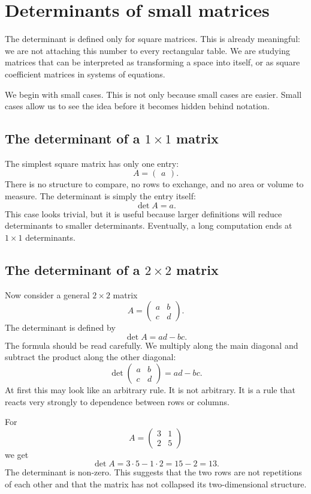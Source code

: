 \section{Determinants of small matrices}

The determinant is defined only for square matrices. This is already meaningful: we are not attaching this number to every rectangular table. We are studying matrices that can be interpreted as transforming a space into itself, or as square coefficient matrices in systems of equations.

We begin with small cases. This is not only because small cases are easier. Small cases allow us to see the idea before it becomes hidden behind notation.

\subsection{The determinant of a \(1\times1\) matrix}

The simplest square matrix has only one entry:
\[
A=\begin{pmatrix}a\end{pmatrix}.
\]
There is no structure to compare, no rows to exchange, and no area or volume to measure. The determinant is simply the entry itself:
\[
\det A=a.
\]
This case looks trivial, but it is useful because larger definitions will reduce determinants to smaller determinants. Eventually, a long computation ends at \(1\times1\) determinants.

\subsection{The determinant of a \(2\times2\) matrix}

Now consider a general \(2\times2\) matrix
\[
A=\begin{pmatrix}a&b\\c&d\end{pmatrix}.
\]
The determinant is defined by
\[
\det A=ad-bc.
\]
The formula should be read carefully. We multiply along the main diagonal and subtract the product along the other diagonal:
\[
\det\begin{pmatrix}a&b\\c&d\end{pmatrix}=ad-bc.
\]
At first this may look like an arbitrary rule. It is not arbitrary. It is a rule that reacts very strongly to dependence between rows or columns.

\begin{examplebox}
For
\[
A=\begin{pmatrix}3&1\\2&5\end{pmatrix}
\]
we get
\[
\det A=3\cdot5-1\cdot2=15-2=13.
\]
The determinant is non-zero. This suggests that the two rows are not repetitions of each other and that the matrix has not collapsed its two-dimensional structure.
\end{examplebox}

